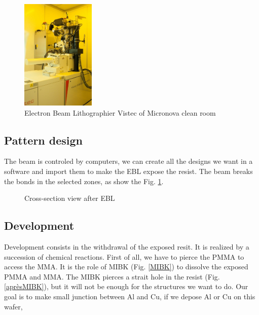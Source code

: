             \begin{figure}[H]
                \centering
                \includegraphics[width=100pt]{EBL.jpg}
                \caption{Electron Beam Lithographier Vistec of Micronova clean room}
            \end{figure}
            
        \subsection{Pattern design}
        
            The beam is controled by computers, we can create all the designs we want in a software and import them to make the EBL expose the resist. The beam breaks the bonds in the selected zones, as show the Fig. \ref{waferEBL}.
            
            \begin{figure}[H]
                \centering
                \caption{Cross-section view after EBL}
                \label{waferEBL}
            \end{figure}
        
        \subsection{Development}
            \label{development}
            Development consists in the withdrawal of the exposed resit. It is realized by a succession of chemical reactions. First of all, we have to pierce the PMMA to access the MMA. It is the role of MIBK (Fig. \ref{MIBK}) to dissolve the exposed PMMA and MMA. The MIBK pierces a strait hole in the resist (Fig. \ref{aprèsMIBK}), but it will not be enough for the structures we want to do. Our goal is to make small junction between Al and Cu, if we depose Al or Cu on this wafer, 
                       
